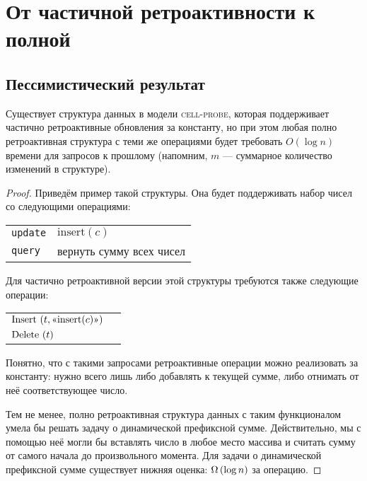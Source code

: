\section{От частичной ретроактивности к полной} 
\subsection{Пессимистический результат}

\begin{theorem}
	Существует структура данных в модели {\scshape cell-probe}, которая поддерживает частично ретроактивные обновления за константу, но при этом любая полно ретроактивная структура с теми же операциями будет требовать $O(\log n)$ времени для запросов к прошлому (напомним, $m$ — суммарное количество изменений в структуре).
\end{theorem}

\begin{proof}
	Приведём пример такой структуры. Она будет поддерживать набор чисел со следующими операциями:

\begin{center} \begin{tabular}{ll}
	{\tt update} & $\text{insert} (c)$ \\
	{\tt query} & вернуть сумму всех чисел
\end{tabular} \end{center}

	Для частично ретроактивной версии этой структуры требуются также следующие операции:

\begin{center} \begin{tabular}{ll}
	$\text{Insert}\, \left( t, \text{«} \text{insert} (c) \text{»}\right)$ \\
	$\text{Delete}\, \left( t \right)$
\end{tabular} \end{center}

	Понятно, что с такими запросами ретроактивные операции можно реализовать за константу: нужно всего лишь либо добавлять к текущей сумме, либо отнимать от неё соответствующее число.
	
	Тем не менее, полно ретроактивная структура данных с таким функционалом умела бы решать задачу о динамической префиксной сумме. Действительно, мы с помощью неё могли бы вставлять число в любое место массива и считать сумму от самого начала до произвольного момента. Для задачи о динамической префиксной сумме существует нижняя оценка: $\Omega \left( \log n \right)$ за операцию.

\end{proof}


